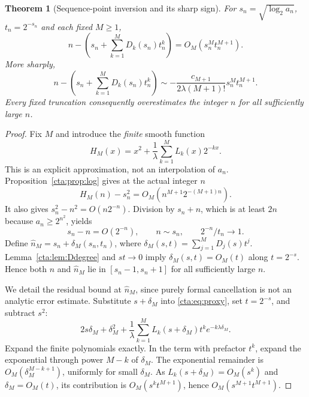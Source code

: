\documentclass[11pt]{article}
\newtheorem{theorem}{Theorem}[section]
\theoremstyle{definition}
\theoremstyle{remark}
\newcommand{\la}{\lambda}
\begin{document}
\begin{theorem}[Sequence-point inversion and its sharp sign]\label{cta:thm:inverse}
For $s_n=\sqrt{\log_2a_n}$, $t_n=2^{-s_n}$ and each fixed $M\geq1$,
\begin{equation}\label{cta:eq:inversebound}
 n-\left(s_n+\sum_{k=1}^MD_k(s_n)t_n^k\right)
       =O_M(s_n^M t_n^{M+1}).
\end{equation}
More sharply,
\begin{equation}\label{cta:eq:inversesharp}
 n-\left(s_n+\sum_{k=1}^MD_k(s_n)t_n^k\right)
 \sim-\frac{c_{M+1}}{2\la(M+1)!}s_n^M t_n^{M+1}.
\end{equation}
Every fixed truncation consequently overestimates the integer $n$
for all sufficiently large $n$.
\end{theorem}
\begin{proof}
Fix $M$ and introduce the \emph{finite} smooth function
\begin{equation}\label{cta:eq:proxy}
 H_M(x)=x^2+\frac1\la\sum_{k=1}^ML_k(x)2^{-kx}.
\end{equation}
This is an explicit approximation, not an interpolation of $a_n$.
Proposition~\ref{cta:prop:log} gives at the actual integer $n$
\begin{equation}\label{cta:eq:resid1}
 H_M(n)-s_n^2=O_M(n^{M+1}2^{-(M+1)n}).
\end{equation}
It also gives $s_n^2-n^2=O(n2^{-n})$. Division by $s_n+n$, which is
at least $2n$ because $a_n\geq2^{n^2}$, yields
\begin{equation}\label{cta:eq:closeness}
 s_n-n=O(2^{-n}),\qquad n\sim s_n,\qquad 2^{-n}/t_n\longrightarrow1.
\end{equation}
Define $\widehat n_M=s_n+\delta_M(s_n,t_n)$, where
$\delta_M(s,t)=\sum_{j=1}^MD_j(s)t^j$.
Lemma~\ref{cta:lem:Ddegree} and $st\to0$ imply $\delta_M(s,t)=O_M(t)$
along $t=2^{-s}$. Hence both $n$ and $\widehat n_M$ lie in
$[s_n-1,s_n+1]$ for all sufficiently large $n$.

We detail the residual bound at $\widehat n_M$, since purely formal
cancellation is not an analytic error estimate. Substitute $s+\delta_M$
into \eqref{cta:eq:proxy}, set $t=2^{-s}$, and subtract $s^2$:
\begin{equation}\label{cta:eq:residualformula}
 2s\delta_M+\delta_M^2+
 \frac1\la\sum_{k=1}^ML_k(s+\delta_M)t^ke^{-k\la\delta_M}.
\end{equation}
Expand the finite polynomials exactly. In the term with prefactor $t^k$,
expand the exponential through power $M-k$ of $\delta_M$. The exponential
remainder is $O_M(\delta_M^{M-k+1})$, uniformly for small $\delta_M$.
As $L_k(s+\delta_M)=O_M(s^k)$ and $\delta_M=O_M(t)$, its contribution
is $O_M(s^kt^{M+1})$, hence $O_M(s^{M+1}t^{M+1})$.


\end{proof}
\end{document}
